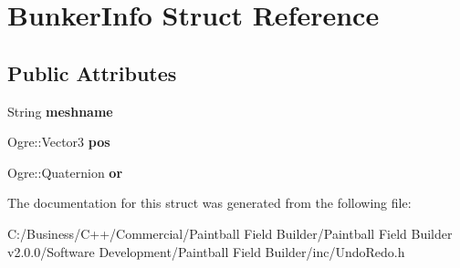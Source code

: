 \hypertarget{struct_bunker_info}{
\section{BunkerInfo Struct Reference}
\label{struct_bunker_info}
}
\subsection*{Public Attributes}
\begin{DoxyCompactItemize}
\item 
\hypertarget{struct_bunker_info_a3ea328a6dfc76733b7bab916108d0e30}{
String {\bfseries meshname}}
\label{struct_bunker_info_a3ea328a6dfc76733b7bab916108d0e30}

\item 
\hypertarget{struct_bunker_info_a84d8c0456b3b5eae2887ff6b5b812057}{
Ogre::Vector3 {\bfseries pos}}
\label{struct_bunker_info_a84d8c0456b3b5eae2887ff6b5b812057}

\item 
\hypertarget{struct_bunker_info_a162f66b30c5f4f5b3f2eb4970d33d26a}{
Ogre::Quaternion {\bfseries or}}
\label{struct_bunker_info_a162f66b30c5f4f5b3f2eb4970d33d26a}

\end{DoxyCompactItemize}


The documentation for this struct was generated from the following file:\begin{DoxyCompactItemize}
\item 
C:/Business/C++/Commercial/Paintball Field Builder/Paintball Field Builder v2.0.0/Software Development/Paintball Field Builder/inc/UndoRedo.h\end{DoxyCompactItemize}

